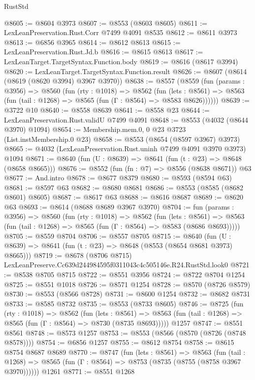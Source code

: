 \begin{lexlean}{RustStd}
\begin{coremodule}
@8605 := @8604 @3973
@8607 := @8553 (@8603 @8605)
@8611 := LexLeanPreservation.Rust.Corr @7499 @4091 @8535
@8612 := @8611 @3973
@8613 := @6856 @3965
@8614 := @8612 @8613
@8615 := LexLeanPreservation.Rust.Jd.b
@8616 := @8615 @8613
@8617 := LexLeanTarget.TargetSyntax.Function.body
@8619 := @8616 (@8617 @3994)
@8620 := LexLeanTarget.TargetSyntax.Function.result
@8626 := @8607 (@8614 (@8619 (@8620 @3994) @3967 @3970))
@8638 := @8557
    (@8559
      (fun (params : @3956) =>
      @8560
        (fun (rty : @1018) =>
        @8562
          (fun (lets : @8561) =>
          @8563 (fun (tail : @1268) => @8565 (fun (Γ : @8564) => @8583 @8626))))))
@8639 := @3722 @10
@8640 := @8558 @8639
@8641 := @8558 @23
@8644 := LexLeanPreservation.Rust.validU @7499 @4091
@8648 := @8553 (@4032 (@8644 @3970) @1094)
@8654 := Membership.mem.{0, 0} @23 @3723 (List.instMembership.{0} @23)
@8658 := @8553 (@8654 (@8597 @3967) @3973)
@8665 := @4032 (LexLeanPreservation.Rust.uninh @7499 @4091 @3970 @3973) @1094
@8671 := @8640 (fun (U : @8639) => @8641 (fun (t : @23) => @8648 (@8658 @8665)))
@8676 := @8552 (fun (fn : @7) => @8556 (@8638 @8671)) @63
@8677 := And.intro
@8678 := @8677 @8379
@8680 := @8593 (@8594 @63)
@8681 := @8597 @63
@8682 := @8680 @8681
@8686 := @8553 (@8585 (@8682 @8601) @8605)
@8687 := @8617 @63
@8688 := @8616 @8687
@8689 := @8620 @63
@8693 := @8614 (@8688 @8689 @3967 @3970)
@8704 := fun (params : @3956) =>
  @8560
    (fun (rty : @1018) =>
    @8562
      (fun (lets : @8561) =>
      @8563 (fun (tail : @1268) => @8565 (fun (Γ : @8564) => @8583 (@8686 @8693)))))
@8705 := @8559 @8704
@8706 := @8557 @8705
@8715 := @8640 (fun (U : @8639) => @8641 (fun (t : @23) => @8648 (@8553 (@8654 @8681 @3973) @8665)))
@8719 := @8678 (@8706 @8715) LexLeanPreserve.Cc639d244984595f0311043c4c505146e.R24.RustStd.look0
@8721 := @8538 @8705 @8715
@8722 := @8551 @3956
@8724 := @8722 @8704 @1254
@8725 := @8551 @1018
@8726 := @8571 @1254
@8728 := @8570 (@8726 @8579)
@8730 := @8553 (@8566 @8728)
@8731 := @8600 @1254
@8732 := @8682 @8731
@8733 := @8585 @8732
@8735 := @8553 (@8733 @8605)
@8746 := @8725
    (fun (rty : @1018) =>
    @8562
      (fun (lets : @8561) =>
      @8563 (fun (tail : @1268) => @8565 (fun (Γ : @8564) => @8730 (@8735 @8693)))))
    @1257
@8747 := @8551 @8561
@8748 := @8573 @1257
@8753 := @8553 (@8566 (@8570 (@8726 (@8748 @8578))))
@8754 := @6856 @1257
@8755 := @8612 @8754
@8758 := @8615 @8754 @8687 @8689
@8770 := @8747
    (fun (lets : @8561) =>
    @8563
      (fun (tail : @1268) => @8565 (fun (Γ : @8564) => @8753 (@8735 (@8755 (@8758 @3967 @3970))))))
    @1261
@8771 := @8551 @1268

\end{coremodule}
\end{lexlean}
